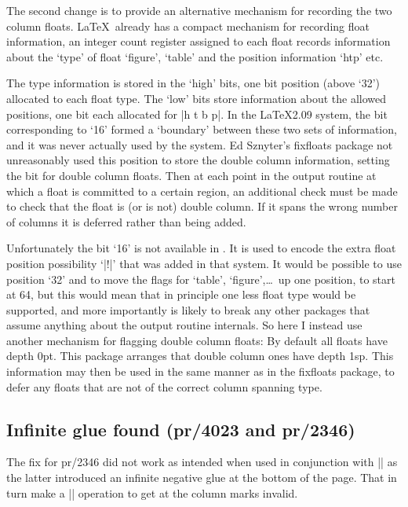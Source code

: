 \documentclass{ltxguide}
\newcommand\Lpack[1]{\mbox{\textsf{#1}}}
\begin{document}
The second change is to provide an alternative mechanism for
recording the two column floats. \LaTeX\ already has a compact
mechanism for recording float information, an integer count register
assigned to each float records information about the `type' of float
`figure', `table' and the position information `htp' etc.

The type information is stored in the `high' bits, one bit position
(above `32') allocated to each float type. The `low' bits store
information about the allowed positions, one bit each allocated for
|h t b p|.  In the \LaTeX2.09 system, the bit corresponding to `16'
formed a `boundary' between these two sets of information, and it
was never actually used by the system. Ed Sznyter's
\Lpack{fixfloats} package not unreasonably used this position to
store the double column information, setting the bit for double
column floats. Then at each point in the output routine at which a
float is committed to a certain region, an additional check must be
made to check that the float is (or is not) double column. If it
spans the wrong number of columns it is deferred rather than being
added.

Unfortunately the bit `16' is not available in \LaTeXe. It is used
to encode the extra float position possibility `|!|' that was added
in that system. It would be possible to use position `32' and to
move the flags for `table', `figure',\ldots\ up one position, to
start at 64, but this would mean that in principle one less float
type would be supported, and more importantly is likely to break
any other packages that assume anything about the output routine
internals. So here I instead use another mechanism for flagging
double column floats: By default all floats have depth 0pt.
This package arranges that double column ones have depth 1sp.
This information may then be used in the same manner as in
the \Lpack{fixfloats} package, to defer any floats that are not of
the correct column spanning type.



\subsection{Infinite glue found (pr/4023 and pr/2346)}

The fix for pr/2346 did not work as intended when used in conjunction
with |\enlargethispage| as the latter introduced an infinite negative
glue at the bottom of the page. That in turn make a |\vsplit|
operation to get at the column marks invalid.
\end{document}
